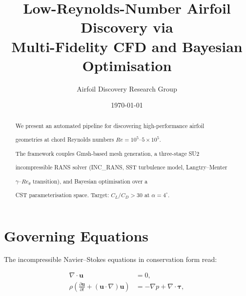 \documentclass{article}
\title{Low-Reynolds-Number Airfoil Discovery via\\

       Multi-Fidelity CFD and Bayesian Optimisation}
\author{Airfoil Discovery Research Group}
\date{\today}
\begin{document}
\maketitle



\begin{abstract}

We present an automated pipeline for discovering high-performance airfoil

geometries at chord Reynolds numbers $Re = 10^5$--$5 \times 10^5$.

The framework couples Gmsh-based mesh generation, a three-stage SU2

incompressible RANS solver (INC\_RANS, SST turbulence model, Langtry--Menter

$\gamma$--$Re_\theta$ transition), and Bayesian optimisation over a

CST parameterisation space.  Target: $C_L/C_D > 30$ at $\alpha = 4^\circ$.

\end{abstract}



\tableofcontents

\newpage




\section{Governing Equations}




The incompressible Navier--Stokes equations in conservation form read:



\begin{align}

  \nabla \cdot \mathbf{u} &= 0, \label{eq:continuity} \\

  \rho \left( \frac{\partial \mathbf{u}}{\partial t}

    + (\mathbf{u} \cdot \nabla)\mathbf{u} \right)

    &= -\nabla p + \nabla \cdot \boldsymbol{\tau}, \label{eq:momentum}

\end{align}
\end{document}
